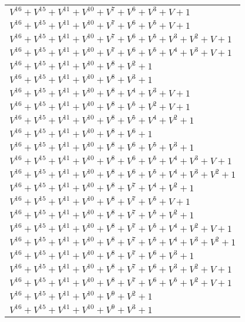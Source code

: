 \documentclass[12pt]{article}
\begin{document}
\begin{adjustwidth}{-4cm}{}
\begin{center}
\begin{longtable}{|l|}
$V^{16}  +V^{15}  +V^{11}  +V^{10}  +V^{7}  +V^{6}  +V^{3}  + V + 1$ \\
$V^{16}  +V^{15}  +V^{11}  +V^{10}  +V^{7}  +V^{6}  +V^{5}  + V + 1$ \\
$V^{16}  +V^{15}  +V^{11}  +V^{10}  +V^{7}  +V^{6}  +V^{5}  +V^{3}  +V^{2}  + V + 1$ \\
$V^{16}  +V^{15}  +V^{11}  +V^{10}  +V^{7}  +V^{6}  +V^{5}  +V^{4}  +V^{3}  + V + 1$ \\
$V^{16}  +V^{15}  +V^{11}  +V^{10}  +V^{8}  +V^{2}  + 1$ \\
$V^{16}  +V^{15}  +V^{11}  +V^{10}  +V^{8}  +V^{3}  + 1$ \\
$V^{16}  +V^{15}  +V^{11}  +V^{10}  +V^{8}  +V^{4}  +V^{3}  + V + 1$ \\
$V^{16}  +V^{15}  +V^{11}  +V^{10}  +V^{8}  +V^{5}  +V^{2}  + V + 1$ \\
$V^{16}  +V^{15}  +V^{11}  +V^{10}  +V^{8}  +V^{5}  +V^{4}  +V^{2}  + 1$ \\
$V^{16}  +V^{15}  +V^{11}  +V^{10}  +V^{8}  +V^{6}  + 1$ \\
$V^{16}  +V^{15}  +V^{11}  +V^{10}  +V^{8}  +V^{6}  +V^{5}  +V^{3}  + 1$ \\
$V^{16}  +V^{15}  +V^{11}  +V^{10}  +V^{8}  +V^{6}  +V^{5}  +V^{4}  +V^{3}  + V + 1$ \\
$V^{16}  +V^{15}  +V^{11}  +V^{10}  +V^{8}  +V^{6}  +V^{5}  +V^{4}  +V^{3}  +V^{2}  + 1$ \\
$V^{16}  +V^{15}  +V^{11}  +V^{10}  +V^{8}  +V^{7}  +V^{4}  +V^{2}  + 1$ \\
$V^{16}  +V^{15}  +V^{11}  +V^{10}  +V^{8}  +V^{7}  +V^{5}  + V + 1$ \\
$V^{16}  +V^{15}  +V^{11}  +V^{10}  +V^{8}  +V^{7}  +V^{5}  +V^{2}  + 1$ \\
$V^{16}  +V^{15}  +V^{11}  +V^{10}  +V^{8}  +V^{7}  +V^{5}  +V^{4}  +V^{2}  + V + 1$ \\
$V^{16}  +V^{15}  +V^{11}  +V^{10}  +V^{8}  +V^{7}  +V^{5}  +V^{4}  +V^{3}  +V^{2}  + 1$ \\
$V^{16}  +V^{15}  +V^{11}  +V^{10}  +V^{8}  +V^{7}  +V^{6}  +V^{3}  + 1$ \\
$V^{16}  +V^{15}  +V^{11}  +V^{10}  +V^{8}  +V^{7}  +V^{6}  +V^{3}  +V^{2}  + V + 1$ \\
$V^{16}  +V^{15}  +V^{11}  +V^{10}  +V^{8}  +V^{7}  +V^{6}  +V^{5}  +V^{2}  + V + 1$ \\
$V^{16}  +V^{15}  +V^{11}  +V^{10}  +V^{9}  +V^{2}  + 1$ \\
$V^{16}  +V^{15}  +V^{11}  +V^{10}  +V^{9}  +V^{3}  + 1$ \\

\end{longtable}
\end{center}
\end{adjustwidth}
\end{document}
